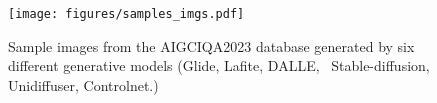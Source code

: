 \begin{figure}[t]
  \centering
  \texttt{[image: figures/samples\_imgs.pdf]}
  \caption{Sample images from the AIGCIQA2023 database generated by six different generative models (Glide\cite{Nichol2021GLIDETP}, Lafite\cite{Zhou_2022_CVPR}, DALLE\cite{ramesh2022hierarchical}, \
  Stable-diffusion\cite{Rombach2021HighResolutionIS}, Unidiffuser\cite{Bao2023OneTF}, Controlnet\cite{Zhang2023AddingCC}.)}
\end{figure}